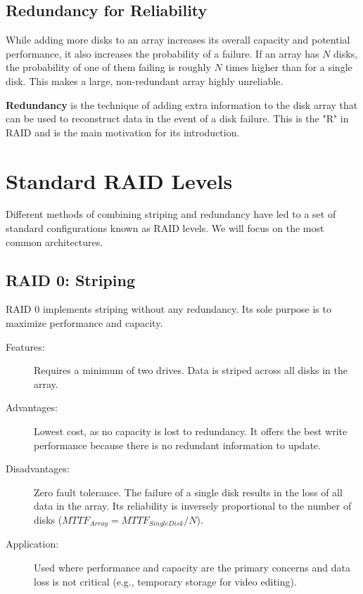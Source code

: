 \subsection{Redundancy for Reliability}
While adding more disks to an array increases its overall capacity and potential performance, it also increases the probability of a failure. If an array has $N$ disks, the probability of one of them failing is roughly $N$ times higher than for a single disk. This makes a large, non-redundant array highly unreliable.

\textbf{Redundancy} is the technique of adding extra information to the disk array that can be used to reconstruct data in the event of a disk failure. This is the "R" in RAID and is the main motivation for its introduction.

\section{Standard RAID Levels}
Different methods of combining striping and redundancy have led to a set of standard configurations known as RAID levels. We will focus on the most common architectures.

\subsection{RAID 0: Striping}
RAID 0 implements striping without any redundancy. Its sole purpose is to maximize performance and capacity.
\begin{description}
    \item[Features:] Requires a minimum of two drives. Data is striped across all disks in the array.
    \item[Advantages:] Lowest cost, as no capacity is lost to redundancy. It offers the best write performance because there is no redundant information to update.
    \item[Disadvantages:] Zero fault tolerance. The failure of a single disk results in the loss of all data in the array. Its reliability is inversely proportional to the number of disks ($MTTF_{Array} = MTTF_{SingleDisk} / N$).
    \item[Application:] Used where performance and capacity are the primary concerns and data loss is not critical (e.g., temporary storage for video editing).
\end{description}


